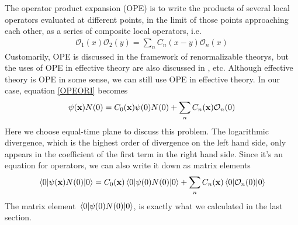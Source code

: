 \documentclass[aps,prd,preprint,showkeys,notitlepage,10pt]{revtex4-1}
\begin{document}
The operator product expansion\cite{Collins1984} (OPE) is to write the products of several local operators evaluated at different points, in the limit of those points approaching each other, as a series of composite local operators, i.e.
\begin{align}
	\mathcal{O}_1(x)\mathcal{O}_2(y)=\sum_nC_n(x-y)\mathcal{O}_n(x)\label{OPEORI}
\end{align}
Customarily, OPE is discussed in the framework of renormalizable theorys, but the uses of OPE in effective theory are also discussed in \cite{Broadhurst1992,Mannel1994,Kawamura2009,Kawamura2009a}, etc. Although effective theory is OPE in some sense, we can still use OPE in effective theory. In our case, equation \eqref{OPEORI} becomes
\begin{align}
	\psi(\vb{x})N(0)=C_0(\vb{x})\psi(0)N(0)+\sum_nC_n(\vb{x})\mathcal{O}_n(0)\label{OPE}
\end{align}
Here we choose equal-time plane to discuss this problem. The logarithmic divergence, which is the highest order of divergence on the left hand side, only appears in the coefficient of the first term in the right hand side. Since it's an equation for operators, we can also write it down as matrix elements
\begin{align}
	\mel{0}{\psi(\vb{x})N(0)}{0}=C_0(\vb{x})\mel{0}{\psi(0)N(0)}{0}+\sum_nC_n(\vb{x})\mel{0}{\mathcal{O}_n(0)}{0}\label{OPEME}
\end{align}
The matrix element $\mel{0}{\psi(0)N(0)}{0}$, is exactly what we calculated in the last section.
\end{document}
